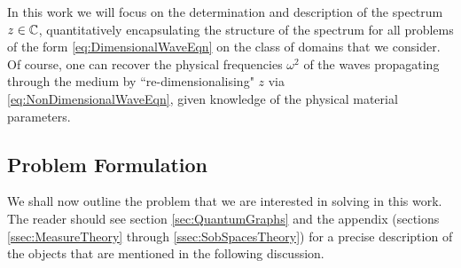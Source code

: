 In this work we will focus on the determination and description of the spectrum $z\in\mathbb{C}$, quantitatively encapsulating the structure of the spectrum for all problems of the form \eqref{eq:DimensionalWaveEqn} on the class of domains that we consider.
Of course, one can recover the physical frequencies $\omega^2$ of the waves propagating through the medium by ``re-dimensionalising" $z$ via \eqref{eq:NonDimensionalWaveEqn}, given knowledge of the physical material parameters.


\subsection{Problem Formulation} \label{ssec:OurSystem}
We shall now outline the problem that we are interested in solving in this work.
The reader should see section \ref{sec:QuantumGraphs} and the appendix (sections \ref{ssec:MeasureTheory} through \ref{ssec:SobSpacesTheory}) for a precise description of the objects that are mentioned in the following discussion. \newline

